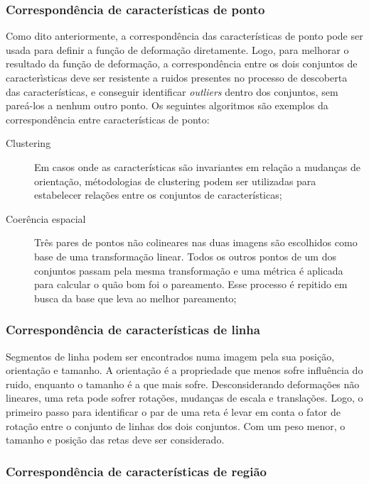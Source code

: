 \subsubsection{Correspondência de características de ponto}

  Como dito anteriormente, a correspondência das características de ponto pode
ser usada para definir a função de deformação diretamente. Logo, para melhorar
o resultado da função de deformação, a correspondência entre os dois conjuntos
de caracterìsticas deve ser resistente a ruidos presentes no processo de
descoberta das características, e conseguir identificar \textit{outliers} dentro
dos conjuntos, sem pareá-los a nenhum outro ponto. Os seguintes algoritmos
são exemplos da correspondência entre características de ponto:

\begin{description}
    \item [Clustering] Em casos onde as características são invariantes em relação
          a mudanças de orientação, métodologias de clustering podem ser utilizadas
          para estabelecer relações entre os conjuntos de características;
    \item [Coerência espacial] Três pares de pontos não colineares nas duas imagens
          são escolhidos como base de uma transformação linear. Todos os outros
          pontos de um dos conjuntos passam pela mesma transformação e uma métrica
          é aplicada para calcular o quão bom foi o pareamento. Esse processo é repitido
          em busca da base que leva ao melhor pareamento;
\end{description}

\subsubsection{Correspondência de características de linha}

  Segmentos de linha podem ser encontrados numa imagem pela sua posição, orientação
e tamanho. A orientação é a propriedade que menos sofre influência do ruido, enquanto
o tamanho é a que mais sofre. Desconsiderando deformações não lineares, uma reta
pode sofrer rotações, mudanças de escala e translações. Logo, o primeiro passo
para identificar o par de uma reta é levar em conta o fator de rotação entre o conjunto
de linhas dos dois conjuntos. Com um peso menor, o tamanho e posição das retas
deve ser considerado.

\subsubsection{Correspondência de características de região}

